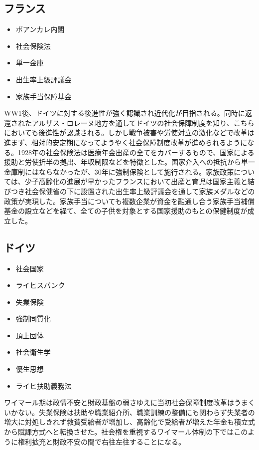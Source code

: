 \documentclass{jsarticle}
\begin{document}
\subsection{フランス}
\begin{itemize}
	\item ポアンカレ内閣
	\item 社会保険法
	\item 単一金庫
	\item 出生率上級評議会
	\item 家族手当保障基金
\end{itemize}

WW1後、ドイツに対する後進性が強く認識され近代化が目指される。同時に返還されたアルザス・ロレーヌ地方を通してドイツの社会保障制度を知り、こちらにおいても後進性が認識される。しかし戦争被害や労使対立の激化などで改革は進まず、相対的安定期になってようやく社会保障制度改革が進められるようになる。1928年の社会保険法は医療年金出産の全てをカバーするもので、国家による援助と労使折半の拠出、年収制限などを特徴とした。国家介入への抵抗から単一金庫制にはならなかったが、30年に強制保険として施行される。家族政策については、少子高齢化の進展が早かったフランスにおいて出産と育児は国家主義と結びつき社会保健省の下に設置された出生率上級評議会を通して家族メダルなどの政策が実現した。家族手当についても複数企業が資金を融通し合う家族手当補償基金の設立などを経て、全ての子供を対象とする国家援助のもとの保健制度が成立した。

\subsection{ドイツ}
\begin{itemize}
	\item 社会国家
	\item ライヒスバンク
	\item 失業保険
	\item 強制同質化
	\item 頂上団体
	\item 社会衛生学
	\item 優生思想
	\item ライヒ扶助義務法
\end{itemize}

ワイマール期は政情不安と財政基盤の弱さゆえに当初社会保障制度改革はうまくいかない。失業保険は扶助や職業紹介所、職業訓練の整備にも関わらず失業者の増大に対処しきれず救貧受給者が増加し、高齢化で受給者が増えた年金も積立式から賦課方式へと転換させた。社会権を重視するワイマール体制の下ではこのように権利拡充と財政不安の間で右往左往することになる。
\end{document}
